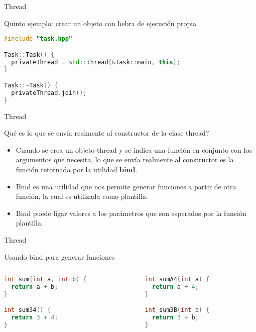 \begin{frame}[fragile]{Thread}
\begin{block}{Quinto ejemplo: crear un objeto con hebra de ejecución propia}
\begin{lstlisting}[language=C++, basicstyle=\small]
#include "task.hpp"

Task::Task() {
  privateThread = std::thread(&Task::main, this);
}

Task::~Task() {
  privateThread.join();
}
\end{lstlisting}
\end{block}
\end{frame}
\begin{frame}{Thread}
\begin{block}{Qué es lo que se envía realmente al constructor de la clase thread?}
\begin{itemize}
  \item Cuando se crea un objeto thread y se indica una función en conjunto con los argumentos que necesita, lo que se envía realmente al constructor es la función retornada por la utilidad \textbf{bind}.
  \item Bind es una utilidad que nos permite generar funciones a partir de otra función, la cual es utilizada como plantilla.
  \item Bind puede ligar valores a los parámetros que son esperados por la función plantilla.
\end{itemize}
\end{block}
\end{frame}

\begin{frame}[fragile]{Thread}
\begin{block}{Usando bind para generar funciones}
  \begin{columns}
  \begin{column}{.45\textwidth}
\begin{lstlisting}[language=C++, basicstyle=\small]
int sum(int a, int b) {
  return a + b;
}

int sum34() {
  return 3 + 4;
}
\end{lstlisting}
  \end{column}
  \begin{column}{.45\textwidth}
\begin{lstlisting}[language=C++, basicstyle=\small]
int sumA4(int a) {
  return a + 4;
}

int sum3B(int b) {
  return 3 + b;
}
\end{lstlisting}
  \end{column}
  \end{columns}
\end{block}
\end{frame}

